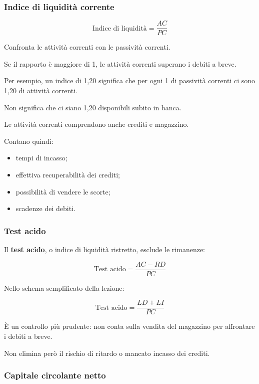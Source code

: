 \subsubsection*{Indice di liquidità corrente}

\[
\boxed{
\text{Indice di liquidità}
=
\frac{AC}{PC}
}
\]

\noindent Confronta le attività correnti
con le passività correnti.

\noindent Se il rapporto è maggiore di 1,
le attività correnti
superano i debiti a breve.

\noindent Per esempio,
un indice di 1,20 significa
che per ogni 1 di passività correnti
ci sono 1,20 di attività correnti.

\medskip

\noindent Non significa che ci siano
1,20 disponibili subito in banca.

\noindent Le attività correnti
comprendono anche crediti e magazzino.

\noindent Contano quindi:

\begin{itemize}
    \item tempi di incasso;
    \item effettiva recuperabilità dei crediti;
    \item possibilità di vendere le scorte;
    \item scadenze dei debiti.
\end{itemize}


\subsubsection*{Test acido}

\noindent Il \textbf{test acido},
o indice di liquidità ristretto,
esclude le rimanenze:

\[
\boxed{
\text{Test acido}
=
\frac{AC-RD}{PC}
}
\]

\noindent Nello schema semplificato
della lezione:

\[
\boxed{
\text{Test acido}
=
\frac{LD+LI}{PC}
}
\]

\noindent È un controllo più prudente:
non conta sulla vendita del magazzino
per affrontare i debiti a breve.

\noindent Non elimina però
il rischio di ritardo
o mancato incasso dei crediti.


\subsubsection*{Capitale circolante netto}

